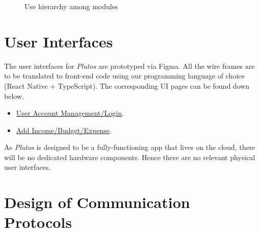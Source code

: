 \documentclass[12pt, titlepage]{article}
\begin{document}

\begin{figure}[H]
\centering
\caption{Use hierarchy among modules}
\label{FigUH}
\end{figure}


\newpage

\section{User Interfaces}

The user interfaces for \textit{Plutos} are prototyped via Figma. All the wire frames are to be translated to front-end code using our programming language of choice (React Native + TypeScript).
The corresponding UI pages can be found down below.
 
\begin{itemize}
	\item \href{https://www.figma.com/design/W2B31TC8L3tgjZm8189vqm/Plutos?node-id=29-45&t=gfR0b4FgWOY40Jt2-1}{User Account Management/Login}.
	\item \href{https://www.figma.com/design/W2B31TC8L3tgjZm8189vqm/Plutos?node-id=112-2933&t=ZbbX5sZyfK6XT3DZ-1}{Add Income/Budget/Expense}.
\end{itemize}

\noindent As \textit{Plutos} is designed to be a fully-functioning app that lives on the cloud, there will be no dedicated hardware components. Hence there are no relevant physical user interfaces.

\section{Design of Communication Protocols}
\end{document}
